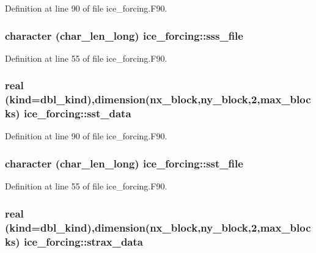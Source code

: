 Definition at line 90 of file ice\_\-forcing.F90.\hypertarget{namespaceice__forcing_a679cbae21b157e961355e2d69701a241}{
\subsubsection[{sss\_\-file}]{\setlength{\rightskip}{0pt plus 5cm}character (char\_\-len\_\-long) {\bf ice\_\-forcing::sss\_\-file}}}
\label{namespaceice__forcing_a679cbae21b157e961355e2d69701a241}


Definition at line 55 of file ice\_\-forcing.F90.\hypertarget{namespaceice__forcing_ab6d2ed507a72720751a324430fb30e40}{
\subsubsection[{sst\_\-data}]{\setlength{\rightskip}{0pt plus 5cm}real (kind=dbl\_\-kind),dimension(nx\_\-block,ny\_\-block,2,max\_\-blocks) {\bf ice\_\-forcing::sst\_\-data}}}
\label{namespaceice__forcing_ab6d2ed507a72720751a324430fb30e40}


Definition at line 90 of file ice\_\-forcing.F90.\hypertarget{namespaceice__forcing_a33afd2f71d0f18c27e6a2e78388dbb31}{
\subsubsection[{sst\_\-file}]{\setlength{\rightskip}{0pt plus 5cm}character (char\_\-len\_\-long) {\bf ice\_\-forcing::sst\_\-file}}}
\label{namespaceice__forcing_a33afd2f71d0f18c27e6a2e78388dbb31}


Definition at line 55 of file ice\_\-forcing.F90.\hypertarget{namespaceice__forcing_a553d40f9acc76f1b6dc8fc56cddccf87}{
\subsubsection[{strax\_\-data}]{\setlength{\rightskip}{0pt plus 5cm}real (kind=dbl\_\-kind),dimension(nx\_\-block,ny\_\-block,2,max\_\-blocks) {\bf ice\_\-forcing::strax\_\-data}}}
\label{namespaceice__forcing_a553d40f9acc76f1b6dc8fc56cddccf87}


